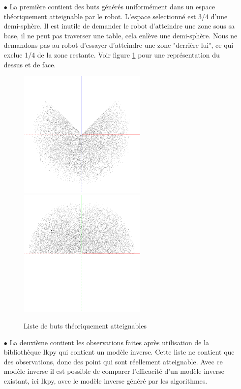 \documentclass[11pt,french]{report}
\begin{document}
\begin{itemize}
    \item[$\bullet$] La première contient des buts générés uniformément dans un espace théoriquement atteignable par le robot. L'espace selectionné est 3/4 d'une demi-sphère. Il est inutile de demander le robot d'atteindre une zone sous sa base, il ne peut pas traverser une table, cela enlève une demi-sphère. Nous ne demandons pas au robot d'essayer d'atteindre une zone "derrière lui", ce qui exclue 1/4 de la zone restante. Voir figure \ref{fig:goal_list} pour une représentation du dessus et de face.
    
    \begin{figure}
        \centering
        \includegraphics[width=178pt]{goal_list_top} \includegraphics[width=178pt]{goal_list_front}
        \caption{Liste de buts théoriquement atteignables}
        \label{fig:goal_list}
    \end{figure}
    
    \item[$\bullet$] La deuxième contient les observations faites après utilisation de la bibliothèque Ikpy qui contient un modèle inverse. Cette liste ne contient que des observations, donc des point qui sont réellement atteignable. Avec ce modèle inverse il est possible de comparer l'efficacité d'un modèle inverse existant, ici Ikpy, avec le modèle inverse généré par les algorithmes.
\end{itemize}
\end{document}
